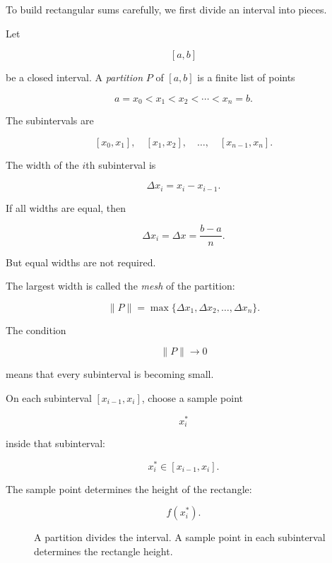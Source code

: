 To build rectangular sums carefully, we first divide an interval into pieces.

Let

\[
[a,b]
\]

be a closed interval.  A \emph{partition} \(P\) of \([a,b]\) is a finite list of points

\[
a=x_0<x_1<x_2<\cdots<x_n=b.
\]

The subintervals are

\[
[x_0,x_1],
\quad
[x_1,x_2],
\quad
\ldots,
\quad
[x_{n-1},x_n].
\]

The width of the \(i\)th subinterval is

\[
\Delta x_i=x_i-x_{i-1}.
\]

If all widths are equal, then

\[
\Delta x_i=\Delta x=\frac{b-a}{n}.
\]

But equal widths are not required.

The largest width is called the \emph{mesh} of the partition:

\[
\lVert P\rVert
=
\max\{\Delta x_1,\Delta x_2,\ldots,\Delta x_n\}.
\]

The condition

\[
\lVert P\rVert\to0
\]

means that every subinterval is becoming small.

On each subinterval \([x_{i-1},x_i]\), choose a sample point

\[
x_i^*
\]

inside that subinterval:

\[
x_i^*\in[x_{i-1},x_i].
\]

The sample point determines the height of the rectangle:

\[
f(x_i^*).
\]

\begin{figure}[h]
\centering
{}
\caption{A partition divides the interval. A sample point in each subinterval determines the rectangle height.}
\label{fig:partition-sample-points}
\end{figure}

